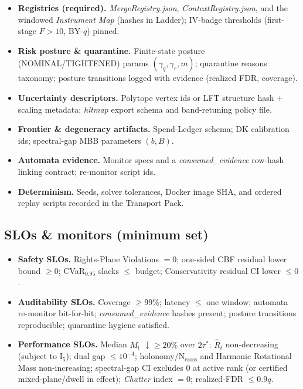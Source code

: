 \documentclass[10pt]{article}
\newcommand{\cutq}{q}
\begin{document}
\begin{itemize}[leftmargin=*]
\item \textbf{Registries (required).} \emph{MergeRegistry.json}, \emph{ContextRegistry.json}, and the windowed \emph{Instrument Map} (hashes in Ladder); IV-badge thresholds (first-stage $F>10$, BY-$q$) pinned.
\item \textbf{Risk posture \& quarantine.} Finite-state posture (NOMINAL/TIGHTENED) params $(\gamma_q,\gamma_r,m)$; quarantine reasons taxonomy; posture transitions logged with evidence (realized FDR, coverage).
\item \textbf{Uncertainty descriptors.} Polytope vertex ids or LFT structure hash + scaling metadata; \emph{hitmap} export schema and band-retuning policy file.
\item \textbf{Frontier \& degeneracy artifacts.} Spend-Ledger schema; DK calibration ids; spectral-gap MBB parameters $(b,B)$.
\item \textbf{Automata evidence.} Monitor specs and a \emph{consumed\_evidence} row-hash linking contract; re-monitor script ids.
\item \textbf{Determinism.} Seeds, solver tolerances, Docker image SHA, and ordered replay scripts recorded in the Transport Pack.
\end{itemize}

\subsection*{SLOs \& monitors (minimum set)}

\begin{itemize}[leftmargin=*]
\item \textbf{Safety SLOs.} Rights-Plane Violations $=0$; one-sided CBF residual lower bound $\ge 0$; CVaR$_{0.95}$ slacks $\le$ budget; \textsf{Conservativity} residual CI lower $\le 0$.
\item \textbf{Auditability SLOs.} Coverage $\ge 99\%$; latency $\le$ one window; automata re-monitor bit-for-bit; \emph{consumed\_evidence} hashes present; posture transitions reproducible; quarantine hygiene satisfied.
\item \textbf{Performance SLOs.} Median $M_t$ $\downarrow\ge 20\%$ over $2\tau^\ast$; $\widehat R_t$ non-decreasing (subject to I$_5$); dual gap $\le 10^{-4}$; holonomy/N$_{\mathrm{cross}}$ and Harmonic Rotational Mass non-increasing; spectral-gap CI excludes $0$ at active rank (or certified mixed-plane/dwell in effect); \emph{Chatter} index $=0$; realized-FDR $\le 0.9\cutq$.
\end{itemize}
\end{document}
